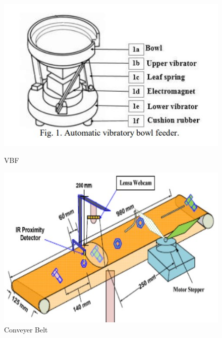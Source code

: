 \begin{figure}[t]
  \begin{minipage}[t]{0.33\textwidth}
    \centering
    \includegraphics[width=\textwidth]{imgs/articles/feeder.jpg}
    \caption{VBF\cite{nam2019design}}
    \label{fig:feeder}
  \end{minipage}
  \hfill
  \begin{minipage}[t]{0.33\textwidth}
      \centering
      \includegraphics[width=\textwidth]{imgs/articles/conveyer.jpg}
      \caption{Conveyer Belt\cite{Dhenge2013MechanicalNS}}
      \label{fig:conveyer}
      \end{minipage}
  \hfill
  \begin{minipage}[t]{0.33\textwidth}
    \centering

\end{minipage}
\end{figure}
